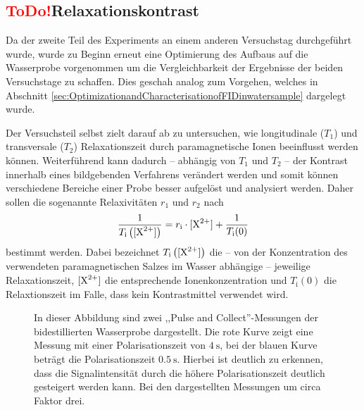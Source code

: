 \subsection{\textcolor{red}{ToDo!}Relaxationskontrast}
\label{sec:Signalintensitaet}
Da der zweite Teil des Experiments an einem anderen Versuchstag durchgeführt wurde, wurde zu Beginn erneut eine Optimierung des Aufbaus auf die Wasserprobe vorgenommen um die Vergleichbarkeit der Ergebnisse der beiden Versuchstage zu schaffen. Dies geschah analog zum Vorgehen, welches in Abschnitt \ref{sec:OptimizationandCharacterisationofFIDinwatersample} dargelegt wurde.

Der Versuchsteil selbst zielt darauf ab zu untersuchen, wie longitudinale ($T_1$) und transversale ($T_2$) Relaxationszeit durch paramagnetische Ionen beeinflusst werden können. 
Weiterführend kann dadurch -- abhängig von $T_1$ und $T_2$ -- der Kontrast innerhalb eines bildgebenden Verfahrens verändert werden und somit können verschiedene Bereiche einer Probe besser aufgelöst und analysiert werden. 
Daher sollen die sogenannte Relaxivitäten $r_1$ und $r_2$ nach
\begin{align}
    \frac{1}{T_{\text{i}}\left([\ce{X^2+}]\right)} = r_{\text{i}} \cdot [\ce{X^2+}] + \frac{1}{T_{\text{i}}(0)} \label{eq:relaxivitat}
\end{align}
bestimmt werden. Dabei bezeichnet $T_{\text{i}}\left([\ce{X^2+}]\right)$ die -- von der Konzentration des verwendeten paramagnetischen Salzes im Wasser abhängige -- jeweilige Relaxationszeit, $[\ce{X^2+}]$  die entsprechende Ionenkonzentration und $T_{\text{i}}(0)$ die Relaxtionszeit im Falle, dass kein Kontrastmittel verwendet wird.




\begin{figure}[H]
    \centering
    
    \caption[Abhängigkeit der Signalintensität von der Polarisationszeit.]{In dieser Abbildung sind zwei ,,Pulse and Collect''-Messungen der bidestillierten Wasserprobe dargestellt. Die rote Kurve zeigt eine Messung mit einer Polarisationszeit von $\SI{4}{\second}$, bei der blauen Kurve beträgt die Polarisationszeit $\SI{0.5}{\second}$. Hierbei ist deutlich zu erkennen, dass die Signalintensität durch die höhere Polarisationszeit deutlich gesteigert werden kann. Bei den dargestellten Messungen um circa Faktor drei.} 
    \label{fig:SignalintensitaetPolarisationszeit}    
\end{figure}







